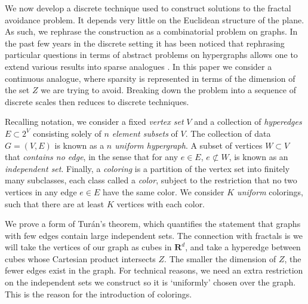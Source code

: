 \documentclass{article}
\theoremstyle{plain}
\theoremstyle{plain}
\begin{document}
\begin{multicols}{2}
We now develop a discrete technique used to construct solutions to the fractal avoidance problem. It depends very little on the Euclidean structure of the plane. As such, we rephrase the construction as a combinatorial problem on graphs. In the past few years in the discrete setting it has been noticed that rephrasing particular questions in terms of abstract problems on hypergraphs allows one to extend various results into sparse analogues \cite{BaloghMorrisSamotij}. In this paper we consider a continuous analogue, where sparsity is represented in terms of the dimension of the set $Z$ we are trying to avoid. Breaking down the problem into a sequence of discrete scales then reduces to discrete techniques.


Recalling notation, we consider a fixed {\it vertex set} $V$ and a collection of {\it hyperedges} $E \subset 2^V$ consisting solely of {\it $n$ element subsets} of $V$. The collection of data $G = (V,E)$ is known as a {\it $n$ uniform hypergraph}. A subset of vertices $W \subset V$ that {\it contains no edge}, in the sense that for any $e \in E$, $e \not \subset W$, is known as an {\it independent set}. Finally, a {\it coloring} is a partition of the vertex set into finitely many subclasses, each class called a {\it color}, subject to the restriction that no two vertices in any edge $e \in E$ have the same color. We consider {\it $K$ uniform} colorings, such that there are at least $K$ vertices with each color.

We prove a form of Tur\'{a}n's theorem, which quantifies the statement that graphs with few edges contain large independent sets. The connection with fractals is we will take the vertices of our graph as cubes in $\mathbf{R}^d$, and take a hyperedge between cubes whose Cartesian product intersects $Z$. The smaller the dimension of $Z$, the fewer edges exist in the graph. For technical reasons, we need an extra restriction on the independent sets we construct so it is `uniformly' chosen over the graph. This is the reason for the introduction of colorings.


\end{multicols}
\end{document}
